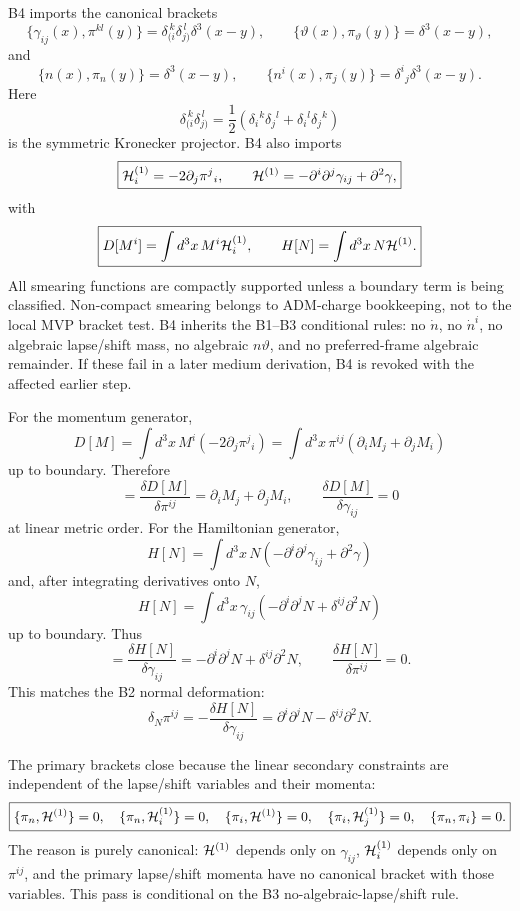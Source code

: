 \documentclass[11pt]{article}
\begin{document}
B4 imports the canonical brackets
\[
\boxed{
\{\gamma_{ij}(x),\pi^{kl}(y)\}
=\delta_{(i}^{\,k}\delta_{j)}^{\,l}\delta^3(x-y),
\qquad
\{\vartheta(x),\pi_\vartheta(y)\}=\delta^3(x-y),
}
\]
and
\[
\boxed{
\{n(x),\pi_n(y)\}=\delta^3(x-y),\qquad
\{n^i(x),\pi_j(y)\}=\delta^i{}_j\delta^3(x-y).
}
\]
Here
\[
\boxed{
\delta_{(i}^{\,k}\delta_{j)}^{\,l}
=\frac12(\delta_i{}^k\delta_j{}^l+\delta_i{}^l\delta_j{}^k)
}
\]
is the symmetric Kronecker projector.  B4 also imports
\[
\boxed{
{\cal H}_i^{(1)}=-2\partial_j\pi^j{}_i,\qquad
{\cal H}^{(1)}=-\partial^i\partial^j\gamma_{ij}+\partial^2\gamma,
}
\]
with
\[
\boxed{
D[M^i]=\int d^3x\,M^i{\cal H}_i^{(1)},\qquad
H[N]=\int d^3x\,N{\cal H}^{(1)}.
}
\]
All smearing functions are compactly supported unless a boundary term is being
classified.  Non-compact smearing belongs to ADM-charge bookkeeping, not to
the local MVP bracket test.  B4 inherits the B1--B3 conditional rules: no
\(\dot n\), no \(\dot n^i\), no algebraic lapse/shift mass, no algebraic
\(n\vartheta\), and no preferred-frame algebraic remainder.  If these fail in
a later medium derivation, B4 is revoked with the affected earlier step.

For the momentum generator,
\[
\boxed{
D[M]=\int d^3x\,M^i(-2\partial_j\pi^j{}_i)
=\int d^3x\,\pi^{ij}(\partial_iM_j+\partial_jM_i)
}
\]
up to boundary.  Therefore
\[
\boxed{
=\frac{\delta D[M]}{\delta\pi^{ij}}
=\partial_iM_j+\partial_jM_i,\qquad
\frac{\delta D[M]}{\delta\gamma_{ij}}=0
}
\]
at linear metric order.  For the Hamiltonian generator,
\[
\boxed{
H[N]=\int d^3x\,N(-\partial^i\partial^j\gamma_{ij}+\partial^2\gamma)
}
\]
and, after integrating derivatives onto \(N\),
\[
\boxed{
H[N]=\int d^3x\,\gamma_{ij}
(-\partial^i\partial^jN+\delta^{ij}\partial^2N)
}
\]
up to boundary.  Thus
\[
\boxed{
=\frac{\delta H[N]}{\delta\gamma_{ij}}
=-\partial^i\partial^jN+\delta^{ij}\partial^2N,\qquad
\frac{\delta H[N]}{\delta\pi^{ij}}=0.
}
\]
This matches the B2 normal deformation:
\[
\boxed{
\delta_N\pi^{ij}
=-\frac{\delta H[N]}{\delta\gamma_{ij}}
=\partial^i\partial^jN-\delta^{ij}\partial^2N.
}
\]

The primary brackets close because the linear secondary constraints are
independent of the lapse/shift variables and their momenta:
\[
\boxed{
\{\pi_n,{\cal H}^{(1)}\}=0,\quad
\{\pi_n,{\cal H}_i^{(1)}\}=0,\quad
\{\pi_i,{\cal H}^{(1)}\}=0,\quad
\{\pi_i,{\cal H}_j^{(1)}\}=0,\quad
\{\pi_n,\pi_i\}=0.
}
\]
The reason is purely canonical: \({\cal H}^{(1)}\) depends only on
\(\gamma_{ij}\), \({\cal H}_i^{(1)}\) depends only on \(\pi^{ij}\), and the
primary lapse/shift momenta have no canonical bracket with those variables.
This pass is conditional on the B3 no-algebraic-lapse/shift rule.
\end{document}

